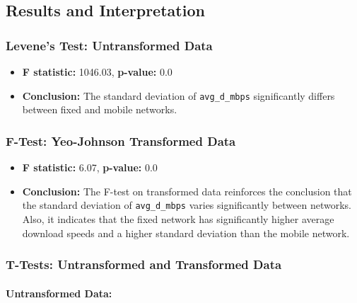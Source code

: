 \documentclass[
  letterpaper,
  DIV=11,
  numbers=noendperiod,
  oneside]{scrartcl}
\let\oldparagraph\paragraph
\renewcommand{\paragraph}[1]{\oldparagraph{#1}\mbox{}}
\providecommand{\tightlist}{%
  \setlength{\itemsep}{0pt}\setlength{\parskip}{0pt}}\usepackage{longtable,booktabs,array}
\begin{document}
\hypertarget{results-and-interpretation}{%
\subsection{Results and
Interpretation}\label{results-and-interpretation}}

\hypertarget{levenes-test-untransformed-data-1}{%
\subsubsection{Levene's Test: Untransformed
Data}\label{levenes-test-untransformed-data-1}}

\begin{itemize}
\tightlist
\item
  \textbf{F statistic:} 1046.03, \textbf{p-value:} 0.0
\item
  \textbf{Conclusion:} The standard deviation of \texttt{avg\_d\_mbps}
  significantly differs between fixed and mobile networks.
\end{itemize}

\hypertarget{f-test-yeo-johnson-transformed-data-1}{%
\subsubsection{F-Test: Yeo-Johnson Transformed
Data}\label{f-test-yeo-johnson-transformed-data-1}}

\begin{itemize}
\tightlist
\item
  \textbf{F statistic:} 6.07, \textbf{p-value:} 0.0
\item
  \textbf{Conclusion:} The F-test on transformed data reinforces the
  conclusion that the standard deviation of \texttt{avg\_d\_mbps} varies
  significantly between networks. Also, it indicates that the fixed
  network has significantly higher average download speeds and a higher
  standard deviation than the mobile network.
\end{itemize}

\hypertarget{t-tests-untransformed-and-transformed-data}{%
\subsubsection{T-Tests: Untransformed and Transformed
Data}\label{t-tests-untransformed-and-transformed-data}}

\hypertarget{untransformed-data}{%
\paragraph{Untransformed Data:}\label{untransformed-data}}
\end{document}
